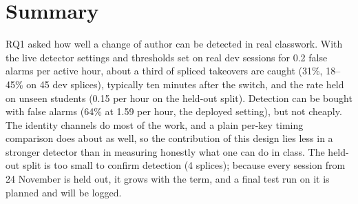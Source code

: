 \section{Summary}
RQ1 asked how well a change of author can be detected in real classwork. With the live
detector settings and thresholds set on real dev sessions for 0.2 false alarms per active
hour, about a third of spliced takeovers are caught (31\%, 18--45\% on 45 dev splices),
typically ten minutes after the switch, and the rate held on unseen students (0.15 per hour on
the held-out split). Detection can be bought with false alarms (64\% at 1.59 per hour, the
deployed setting), but not cheaply. The identity channels do most of the work, and a plain
per-key timing comparison does about as well, so the contribution of this design lies less in
a stronger detector than in measuring honestly what one can do in class. The held-out split
is too small to confirm detection (4 splices); because every session from 24 November is held
out, it grows with the term, and a final test run on it is planned and will be logged.
